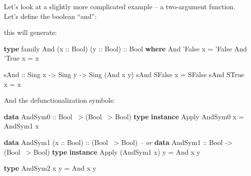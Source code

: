\documentclass[]{article}
\newenvironment{Shaded}{}{}
\newcommand{\CommentTok}[1]{\textcolor[rgb]{0.38,0.63,0.69}{\textit{#1}}}
\newcommand{\DataTypeTok}[1]{\textcolor[rgb]{0.56,0.13,0.00}{#1}}
\newcommand{\FunctionTok}[1]{\textcolor[rgb]{0.02,0.16,0.49}{#1}}
\newcommand{\KeywordTok}[1]{\textcolor[rgb]{0.00,0.44,0.13}{\textbf{#1}}}
\newcommand{\NormalTok}[1]{#1}
\newcommand{\OtherTok}[1]{\textcolor[rgb]{0.00,0.44,0.13}{#1}}
\begin{document}
Let's look at a slightly more complicated example -- a two-argument function.
Let's define the boolean ``and'':

\begin{Shaded}
\end{Shaded}

this will generate:

\begin{Shaded}
\begin{Highlighting}[]
\KeywordTok{type}\NormalTok{ family }\DataTypeTok{And}\NormalTok{ (}\OtherTok{x ::} \DataTypeTok{Bool}\NormalTok{) (}\OtherTok{y ::} \DataTypeTok{Bool}\NormalTok{)}\OtherTok{ ::} \DataTypeTok{Bool} \KeywordTok{where}
    \DataTypeTok{And}\NormalTok{ '}\DataTypeTok{False}\NormalTok{ x }\FunctionTok{=}\NormalTok{ '}\DataTypeTok{False}
    \DataTypeTok{And}\NormalTok{ '}\DataTypeTok{True}\NormalTok{  x }\FunctionTok{=}\NormalTok{ x}

\OtherTok{sAnd ::} \DataTypeTok{Sing}\NormalTok{ x }\OtherTok{->} \DataTypeTok{Sing}\NormalTok{ y }\OtherTok{->} \DataTypeTok{Sing}\NormalTok{ (}\DataTypeTok{And}\NormalTok{ x y)}
\NormalTok{sAnd }\DataTypeTok{SFalse}\NormalTok{ x }\FunctionTok{=} \DataTypeTok{SFalse}
\NormalTok{sAnd }\DataTypeTok{STrue}\NormalTok{  x }\FunctionTok{=}\NormalTok{ x}
\end{Highlighting}
\end{Shaded}

And the defunctionalization symbols:

\begin{Shaded}
\begin{Highlighting}[]
\KeywordTok{data} \DataTypeTok{AndSym0}\OtherTok{ ::} \DataTypeTok{Bool} \FunctionTok{~>}\NormalTok{ (}\DataTypeTok{Bool} \FunctionTok{~>} \DataTypeTok{Bool}\NormalTok{)}
\KeywordTok{type} \KeywordTok{instance} \DataTypeTok{Apply} \DataTypeTok{AndSym0}\NormalTok{ x }\FunctionTok{=} \DataTypeTok{AndSym1}\NormalTok{ x}

\KeywordTok{data} \DataTypeTok{AndSym1}\NormalTok{ (}\OtherTok{x ::} \DataTypeTok{Bool}\NormalTok{)}\OtherTok{ ::}\NormalTok{ (}\DataTypeTok{Bool} \FunctionTok{~>} \DataTypeTok{Bool}\NormalTok{)}
\CommentTok{-- or}
\KeywordTok{data} \DataTypeTok{AndSym1}\OtherTok{ ::} \DataTypeTok{Bool} \OtherTok{->}\NormalTok{ (}\DataTypeTok{Bool} \FunctionTok{~>} \DataTypeTok{Bool}\NormalTok{)}
\KeywordTok{type} \KeywordTok{instance} \DataTypeTok{Apply}\NormalTok{ (}\DataTypeTok{AndSym1}\NormalTok{ x) y }\FunctionTok{=} \DataTypeTok{And}\NormalTok{ x y}

\KeywordTok{type} \DataTypeTok{AndSym2}\NormalTok{ x y }\FunctionTok{=} \DataTypeTok{And}\NormalTok{ x y}
\end{Highlighting}
\end{Shaded}
\end{document}
